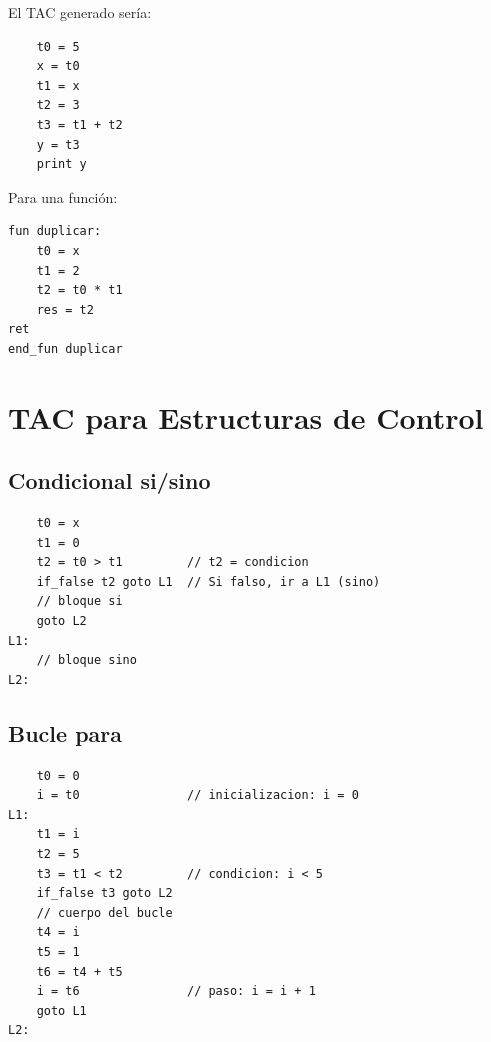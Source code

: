 El TAC generado sería:
\begin{verbatim}
    t0 = 5
    x = t0
    t1 = x
    t2 = 3
    t3 = t1 + t2
    y = t3
    print y
\end{verbatim}

Para una función:
\begin{verbatim}
fun duplicar:
    t0 = x
    t1 = 2
    t2 = t0 * t1
    res = t2
ret
end_fun duplicar
\end{verbatim}

\section{TAC para Estructuras de Control}

\subsection{Condicional si/sino}

\begin{verbatim}
    t0 = x
    t1 = 0
    t2 = t0 > t1         // t2 = condicion
    if_false t2 goto L1  // Si falso, ir a L1 (sino)
    // bloque si
    goto L2
L1:
    // bloque sino
L2:
\end{verbatim}

\subsection{Bucle para}

\begin{verbatim}
    t0 = 0
    i = t0               // inicializacion: i = 0
L1:
    t1 = i
    t2 = 5
    t3 = t1 < t2         // condicion: i < 5
    if_false t3 goto L2
    // cuerpo del bucle
    t4 = i
    t5 = 1
    t6 = t4 + t5
    i = t6               // paso: i = i + 1
    goto L1
L2:
\end{verbatim}
